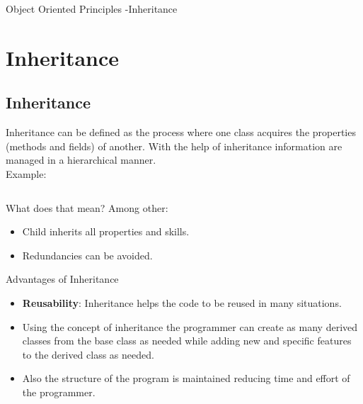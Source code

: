 \documentclass[10pt]{beamer}
\begin{document}
		\begin{frame}{Object Oriented Principles -Inheritance}
			\section{Inheritance}
			\subsection{Inheritance}
			Inheritance can be defined as the process where one class acquires the properties (methods and fields) of another. With the help of inheritance information are managed in a hierarchical manner.\\

			Example: 
			\begin{columns}[T,onlytextwidth]
				\begin{column}{.4\textwidth}
					\begin{minipage}{\textwidth}
						
					\end{minipage}
				\end{column}
				\begin{column}{.4\textwidth}
					\begin{minipage}{\textwidth}
						
					\end{minipage}			
				\end{column}
			\end{columns}
			
			What does that mean? Among other:
			\begin{itemize}
				\item{Child inherits all properties and skills.}
				\item{Redundancies can be avoided.}
			\end{itemize}
		\end{frame}
		\begin{frame}{Advantages of Inheritance}
			\begin{itemize}
				\item \textbf{Reusability}: Inheritance helps the code to be reused in many situations.
				\item Using the concept of inheritance the programmer can create as many derived classes from the base class as needed while adding new and specific features to the derived class as needed.
				\item Also the structure of the program is maintained reducing time and effort of the programmer.
			\end{itemize}
		\end{frame}
		
\end{document}
